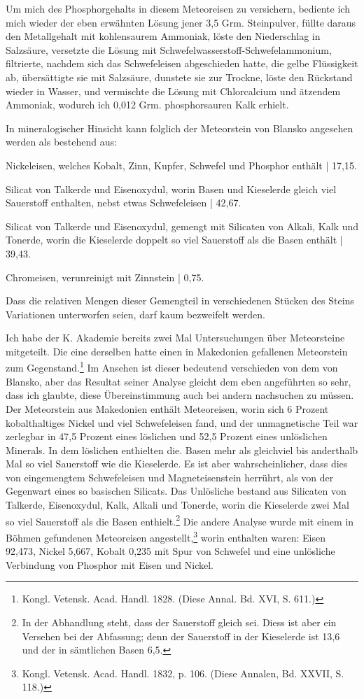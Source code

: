 \documentclass[a4paper, 11pt, oneside]{article}
\begin{document}
Um mich des Phosphorgehalts in diesem Meteoreisen zu versichern, bediente ich mich wieder der eben erwähnten Lösung jener 3,5 Grm. Steinpulver, füllte daraus den Metallgehalt mit kohlensaurem Ammoniak‚ löste den Niederschlag in Salzsäure, versetzte die Lösung mit Schwefelwasserstoff-Schwefelammonium, filtrierte, nachdem sich das Schwefeleisen abgeschieden hatte, die gelbe Flüssigkeit ab, übersättigte sie mit Salzsäure, dunstete sie zur Trockne, löste den Rückstand wieder in Wasser, und vermischte die Lösung mit Chlorcalcium und ätzendem Ammoniak, wodurch ich 0,012 Grm. phosphorsauren Kalk erhielt.

In mineralogischer Hinsicht kann folglich der Meteorstein von Blansko angesehen werden als bestehend aus:

Nickeleisen, welches Kobalt, Zinn, Kupfer, Schwefel und Phosphor enthält | 17,15.

Silicat von Talkerde und Eisenoxydul, worin Basen und Kieselerde gleich viel Sauerstoff enthalten, nebst etwas Schwefeleisen | 42,67.

Silicat von Talkerde und Eisenoxydul, gemengt mit Silicaten von Alkali, Kalk und Tonerde, worin die Kieselerde doppelt so viel Sauerstoff als die Basen enthält | 39,43.

Chromeisen, verunreinigt mit Zinnstein | 0,75.

Dass die relativen Mengen dieser Gemengteil in verschiedenen Stücken des Steins Variationen unterworfen seien, darf kaum bezweifelt werden.

Ich habe der K. Akademie bereits zwei Mal Untersuchungen über Meteorsteine mitgeteilt. Die eine derselben hatte einen in Makedonien gefallenen Meteorstein zum Gegenstand.\footnote{Kongl. Vetensk. Acad. Handl. 1828. (Diese Annal. Bd. XVI, S. 611.)} Im Ansehen ist dieser bedeutend verschieden von dem von Blansko, aber das Resultat seiner Analyse gleicht dem eben angeführten so sehr, dass ich glaubte, diese Übereinstimmung auch bei andern nachsuchen zu müssen. Der Meteorstein aus Makedonien enthält Meteoreisen, worin sich 6 Prozent kobalthaltiges Nickel und viel Schwefeleisen fand, und der unmagnetische Teil war zerlegbar in 47,5 Prozent eines löslichen und 52,5 Prozent eines unlöslichen Minerals. In dem löslichen enthielten die. Basen mehr als gleichviel bis anderthalb Mal so viel Sauerstoff wie die Kieselerde. Es ist aber wahrscheinlicher, dass dies von eingemengtem Schwefeleisen und Magneteisenstein herrührt, als von der Gegenwart eines so basischen Silicats. Das Unlösliche bestand aus Silicaten von Talkerde, Eisenoxydul, Kalk, Alkali und Tonerde, worin die Kieselerde zwei Mal so viel Sauerstoff als die Basen enthielt.\footnote{In der Abhandlung steht, dass der Sauerstoff gleich sei. Diess ist aber ein Versehen bei der Abfassung; denn der Sauerstoff in der Kieselerde ist 13,6 und der in sämtlichen Basen 6,5.} Die andere Analyse wurde mit einem in Böhmen gefundenen Meteoreisen angestellt,\footnote{Kongl. Vetensk. Acad. Handl. 1832, p. 106. (Diese Annalen, Bd. XXVII, S. 118.)} worin enthalten waren: Eisen 92,473, Nickel 5,667, Kobalt 0,235 mit Spur von Schwefel und eine unlösliche Verbindung von Phosphor mit Eisen und Nickel.
\end{document}
